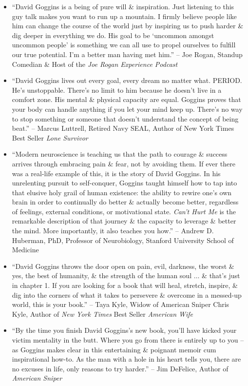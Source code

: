 \documentclass{article}
\numberwithin{equation}{section}
\begin{document}
\begin{itemize}
	\item ``David Goggins is a being of pure will \& inspiration. Just listening to this guy talk makes you want to run up a mountain. I firmly believe people like him can change the course of the world just by inspiring us to push harder \& dig deeper in everything we do. His goal to be `uncommon amongst uncommon people' is something we can all use to propel ourselves to fulfill our true potential. I'm a better man having met him.'' -- Joe Rogan, Standup Comedian \& Host of the \textit{Joe Rogan Experience Podcast}
	\item ``David Goggins lives out every goal, every dream no matter what. PERIOD. He's unstoppable. There's no limit to him because he doesn't live in a comfort zone. His mental \& physical capacity are equal. Goggins proves that your body can handle anything if you let your mind keep up. There's no way to stop something or someone that doesn't understand the concept of being beat.'' -- Marcus Luttrell, Retired Navy SEAL, Author of New York Times Best Seller \textit{Lone Survivor}
	\item ``Modern neuroscience is teaching us that the path to courage \& success arrives through embracing pain \& fear, not by avoiding them. If ever there was a real-life example of this, it is the story of David Goggins. In his unrelenting pursuit to self-conquer, Goggins taught himself how to tap into that elusive holy grail of human existence: the ability to rewire one's own brain in order to continually do better \& actually become better, regardless of feelings, external conditions, or motivational state. \textit{Can't Hurt Me} is the remarkable description of that journey \& the capacity to leverage \& better the mind. More importantly, it also teaches you how.'' -- Andrew D. Huberman, PhD, Professor of Neurobiology, Stanford University School of Medicine
	\item ``David Goggins throws the door open on pain, evil, darkness, the worst \& yes, the best of humanity, \& the strength of the human soul $\ldots$ \& that's just in chapter 1. If you are looking for a book that will heal, stretch, inspire, \& dig into the corners of what it takes to persevere \& overcome in a messed-up world, this is your book.'' -- Taya Kyle, Widow of American Sniper Chris Kyle, Author of \textit{New York Times} Best Seller \textit{American Wife}
	\item ``By the time you finish David Goggins's new book, you'll have kicked your victim mentality in the butt. Where you go from there is entirely up to you -- as Goggins makes clear in this entertaining \& poignant memoir cum inspirational how-to. As the man with a hole in his heart tells you, there are no excuses in life, only reasons to try harder.'' -- Jim DeFelice, Author of \textit{American Sniper}

\end{itemize}
\end{document}

